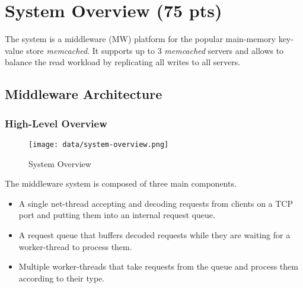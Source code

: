 \documentclass[report.tex]{subfiles}
\begin{document}
\section{System Overview (75 pts)}




The system is a middleware (MW) platform for the popular main-memory key-value store \emph{memcached}. 
It supports up to 3 \emph{memcached} servers and allows to balance the read workload by replicating all writes to all servers.


\subsection{Middleware Architecture}
\subsubsection{High-Level Overview}

\begin{figure}
	\centering
	\texttt{[image: data/system-overview.png]}
	\caption{System Overview}
\end{figure}

The middleware system is composed of three main components. 
\begin{itemize}
\vitemsep
\item A single net-thread accepting and decoding requests from clients on a TCP port and putting them into an internal request queue.
\item A request queue that buffers decoded requests while they are waiting for a worker-thread to process them.
\item Multiple worker-threads that take requests from the queue and process them according to their type.
\end{itemize}
\end{document}
